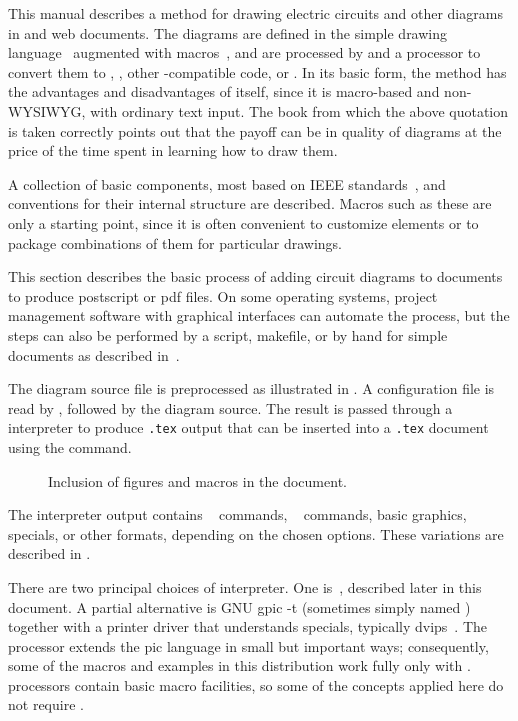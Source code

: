 This manual
describes a method for drawing electric circuits and
other diagrams in \latex and web documents.
The diagrams are defined in the simple \pic drawing language~\cite{KRpic}
augmented with \Mfour macros~\cite{KRm4}, and are
processed by \Mfour and a \pic processor to
convert them to \TPGF, \PSTricks, other \latex-compatible code, or \SVG.
In its basic form, the method has the advantages and disadvantages of
\tex itself, since it is macro-based and non-WYSIWYG,
with ordinary text input.  The book from which the above quotation
is taken correctly points out that the payoff can be in quality of
diagrams at the price of the time spent in learning how to draw them.

A collection of basic components, most based on IEEE
standards~\cite{IEEEstd},
and conventions for their internal
structure are described.  Macros such as these are only a starting
point, since it is often convenient to customize elements or to package
combinations of them for particular drawings.

This section describes the basic process of adding circuit diagrams to
\latex documents to produce postscript or pdf files.  On some operating
systems, project management software with graphical interfaces can
automate the process, but the steps can also be performed by a script,
makefile, or by hand for simple documents as described in~.

The diagram source file is preprocessed as illustrated in
.  A configuration file is read by \Mfour,
followed by the diagram source.
The result is passed through a
\pic interpreter to produce {\tt .tex} output that can be inserted
into a {\tt .tex} document using the \verb|| command.

\begin{figure}[hbt]
 \caption{Inclusion of figures and macros in the \latex document.
 \label{Flowdiag}}
 \end{figure}

\noindent
The interpreter output contains
\TPGF~\cite{tikz} commands,
\PSTricks~\cite{pstricks} commands,
basic \latex graphics, 
\tpic specials, or other formats,
depending on the chosen options.
These variations are described in .

There are two principal choices of \pic interpreter.  One is~\dpic,
described later in this document.  A partial alternative is
GNU {\bq gpic -t} (sometimes simply named \pic)~\cite{gpic}
together with a printer driver
that understands \tpic specials, typically {\bq dvips}~\cite{dvips}.
The \dpic processor extends the pic language in small but important ways;
consequently, some of the macros and examples in this distribution work fully
only with \dpic.
\Pic processors contain basic macro facilities, so some of the
concepts applied here do not require \Mfour.


